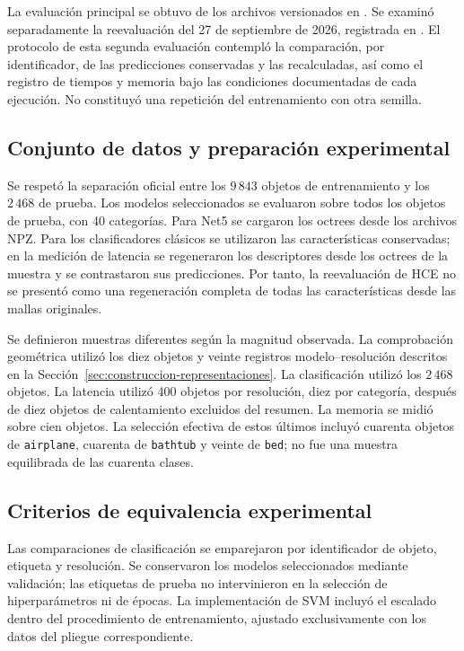 La evaluación principal se obtuvo de los archivos versionados en \protect{}. Se examinó separadamente la reevaluación del 27 de septiembre de 2026, registrada en \protect{}. El protocolo de esta segunda evaluación contempló la comparación, por identificador, de las predicciones conservadas y las recalculadas, así como el registro de tiempos y memoria bajo las condiciones documentadas de cada ejecución. No constituyó una repetición del entrenamiento con otra semilla.

\subsection{Conjunto de datos y preparación experimental}
\label{subsec:datos-preparacion}
Se respetó la separación oficial entre los $9\,843$ objetos de entrenamiento y los $2\,468$ de prueba. Los modelos seleccionados se evaluaron sobre todos los objetos de prueba, con 40 categorías. Para Net5 se cargaron los octrees desde los archivos NPZ. Para los clasificadores clásicos se utilizaron las características conservadas; en la medición de latencia se regeneraron los descriptores desde los octrees de la muestra y se contrastaron sus predicciones. Por tanto, la reevaluación de HCE no se presentó como una regeneración completa de todas las características desde las mallas originales.

Se definieron muestras diferentes según la magnitud observada. La comprobación geométrica utilizó los diez objetos y veinte registros modelo--resolución descritos en la Sección~\ref{sec:construccion-representaciones}. La clasificación utilizó los $2\,468$ objetos. La latencia utilizó 400 objetos por resolución, diez por categoría, después de diez objetos de calentamiento excluidos del resumen. La memoria se midió sobre cien objetos. La selección efectiva de estos últimos incluyó cuarenta objetos de \texttt{airplane}, cuarenta de \texttt{bathtub} y veinte de \texttt{bed}; no fue una muestra equilibrada de las cuarenta clases.

\subsection{Criterios de equivalencia experimental}
\label{subsec:equivalencia-experimental}
Las comparaciones de clasificación se emparejaron por identificador de objeto, etiqueta y resolución. Se conservaron los modelos seleccionados mediante validación; las etiquetas de prueba no intervinieron en la selección de hiperparámetros ni de épocas. La implementación de SVM incluyó el escalado dentro del procedimiento de entrenamiento, ajustado exclusivamente con los datos del pliegue correspondiente.

